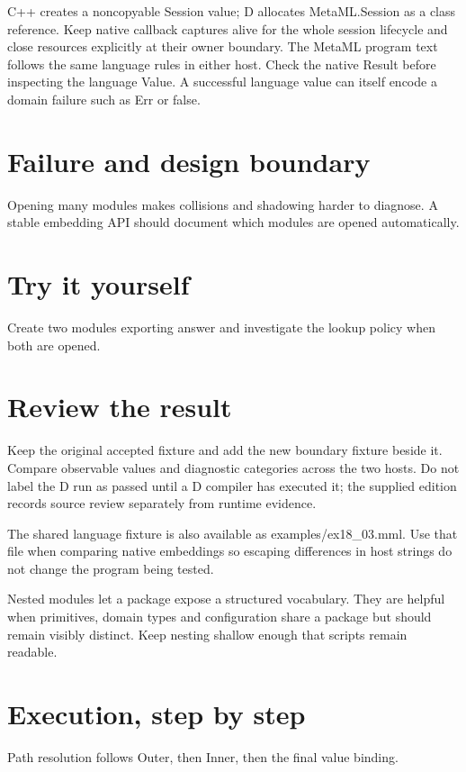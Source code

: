 \clearpage
{}
C++ creates a noncopyable Session value; D allocates MetaML.Session as a class reference. Keep native callback captures alive for the whole session lifecycle and close resources explicitly at their owner boundary. The MetaML program text follows the same language rules in either host. Check the native Result before inspecting the language Value. A successful language value can itself encode a domain failure such as Err or false.


\section*{Failure and design boundary}
Opening many modules makes collisions and shadowing harder to diagnose. A stable embedding API should document which modules are opened automatically.

\section*{Try it yourself}
Create two modules exporting answer and investigate the lookup policy when both are opened.

\section*{Review the result}
Keep the original accepted fixture and add the new boundary fixture beside it. Compare observable values and diagnostic categories across the two hosts. Do not label the D run as passed until a D compiler has executed it; the supplied edition records source review separately from runtime evidence.

The shared language fixture is also available as examples/ex18\_03.mml. Use that file when comparing native embeddings so escaping differences in host strings do not change the program being tested.

\clearpage
{}
Nested modules let a package expose a structured vocabulary. They are helpful when primitives, domain types and configuration share a package but should remain visibly distinct. Keep nesting shallow enough that scripts remain readable.


\section*{Execution, step by step}
Path resolution follows Outer, then Inner, then the final value binding.

